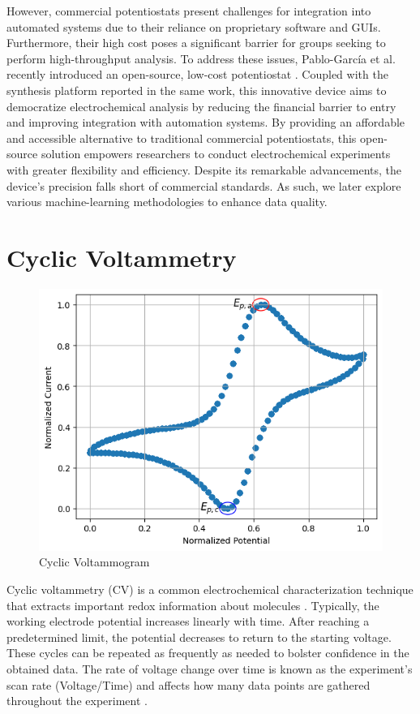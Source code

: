 However, commercial potentiostats present challenges for integration into automated systems due to their reliance on proprietary software and GUIs. Furthermore, their high cost poses a significant barrier for groups seeking to perform high-throughput analysis. To address these issues, Pablo-García et al. recently introduced an open-source, low-cost potentiostat \cite{PabloGarca2024}. Coupled with the synthesis platform reported in the same work, this innovative device aims to democratize electrochemical analysis by reducing the financial barrier to entry and improving integration with automation systems. By providing an affordable and accessible alternative to traditional commercial potentiostats, this open-source solution empowers researchers to conduct electrochemical experiments with greater flexibility and efficiency. Despite its remarkable advancements, the device's precision falls short of commercial standards. As such, we later explore various machine-learning methodologies to enhance data quality. 
\section{Cyclic Voltammetry}
\begin{figure}[h!]
  \centering
    \includegraphics[width=1.0\textwidth]{figures/cv_example.png}
    \caption{Cyclic Voltammogram}
    \label{cv_example}
\end{figure}
Cyclic voltammetry (CV) is a common electrochemical characterization technique that extracts important redox information about molecules \cite{doi:10.1021/ac60210a007}. Typically, the working electrode potential increases linearly with time. After reaching a predetermined limit, the potential decreases to return to the starting voltage. These cycles can be repeated as frequently as needed to bolster confidence in the obtained data. The rate of voltage change over time is known as the experiment's scan rate \mbox{(Voltage/Time)} and affects how many data points are gathered throughout the experiment \cite{https://doi.org/10.1002/anie.198408313}. 


